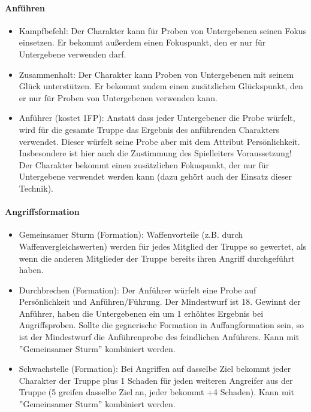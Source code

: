 \documentclass{article}
\begin{document}
\paragraph{Anführen}

\begin{itemize}
\item Kampfbefehl: Der Charakter kann für Proben von Untergebenen seinen Fokus einsetzen. Er bekommt außerdem einen Fokuspunkt, den er nur für Untergebene verwenden darf.
\item Zusammenhalt: Der Charakter kann Proben von Untergebenen mit seinem Glück unterstützen. Er bekommt zudem einen zusätzlichen Glückspunkt, den er nur für Proben von Untergebenen verwenden kann.
\item Anführer (kostet 1FP): Anstatt dass jeder Untergebener die Probe würfelt, wird für die gesamte Truppe das Ergebnis des anführenden Charakters verwendet. Dieser würfelt seine Probe aber mit dem Attribut Persönlichkeit. Insbesondere ist hier auch die Zustimmung des Spielleiters Voraussetzung! Der Charakter bekommt einen zusätzlichen Fokuspunkt, der nur für Untergebene verwendet werden kann (dazu gehört auch der Einsatz dieser Technik).
\end{itemize}

\paragraph{Angriffsformation}

\begin{itemize}
\item Gemeinsamer Sturm (Formation): Waffenvorteile (z.B. durch Waffenvergleichswerten) werden für jedes Mitglied der Truppe so gewertet, als wenn die anderen Mitglieder der Truppe bereits ihren Angriff durchgeführt haben.
\item Durchbrechen (Formation): Der Anführer würfelt eine Probe auf Persönlichkeit und Anführen/Führung. Der Mindestwurf ist 18. Gewinnt der Anführer, haben die Untergebenen ein um 1 erhöhtes Ergebnis bei Angriffsproben. Sollte die gegnerische Formation in Auffangformation sein, so ist der Mindestwurf die Anführenprobe des feindlichen Anführers. Kann mit ''Gemeinsamer Sturm'' kombiniert werden.
\item Schwachstelle (Formation): Bei Angriffen auf dasselbe Ziel bekommt jeder Charakter der Truppe plus 1 Schaden für jeden weiteren Angreifer aus der Truppe (5 greifen dasselbe Ziel an, jeder bekommt +4 Schaden). Kann mit ''Gemeinsamer Sturm'' kombiniert werden.
\end{itemize}
\end{document}
